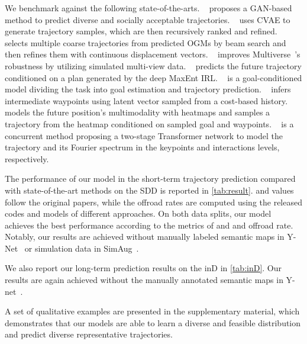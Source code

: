 \documentclass[10pt,twocolumn,letterpaper]{article}
\begin{document}
We benchmark against the following state-of-the-arts.
    ~\cite{gupta2018social} proposes a GAN-based method to predict diverse and socially acceptable trajectories.
       ~\cite{lee2017desire} uses CVAE to generate trajectory samples, which are then recursively ranked and refined.
    ~\cite{liang2020garden} selects multiple coarse trajectories from predicted OGMs by beam search and then refines them with continuous displacement vectors.
        ~\cite{liang2020simaug} improves Multiverse~\cite{liang2020garden}'s robustness by utilizing simulated multi-view data. 
        ~\cite{deo2020trajectory} predicts the future trajectory conditioned on a plan generated by the deep MaxEnt IRL. 
        ~\cite{mangalam2020not} is a goal-conditioned model dividing the task into goal estimation and trajectory prediction. 
        ~\cite{pang2021trajectory} infers intermediate waypoints using latent vector sampled from a cost-based history.
        ~\cite{mangalam2021goals} models the future position's multimodality with heatmaps and samples a trajectory from the heatmap conditioned on sampled goal and waypoints. 
        ~\cite{wong2021view} is a concurrent method proposing a two-stage Transformer network to model the trajectory and its Fourier spectrum in the keypoints and interactions levels, respectively.

The performance of our model in the short-term trajectory prediction compared with state-of-the-art methods on the SDD is reported in \cref{tab:result}.  and  values follow the original papers, while the offroad rates are computed using the released codes and models of different approaches.
On both data splits, our model achieves the best performance according to the metrics of  and  and offroad rate. Notably, our results are achieved without manually labeled semantic maps in Y-Net~\cite{mangalam2021goals} or simulation data in SimAug~\cite{liang2020simaug}. 

We also report our long-term prediction results on the inD in \cref{tab:inD}. Our results are again achieved without the manually annotated semantic maps in Y-net~\cite{mangalam2021goals}.

A set of qualitative examples are presented in the supplementary material, which demonstrates that our models are able to learn a diverse and feasible distribution and predict diverse representative trajectories. 
\end{document}
